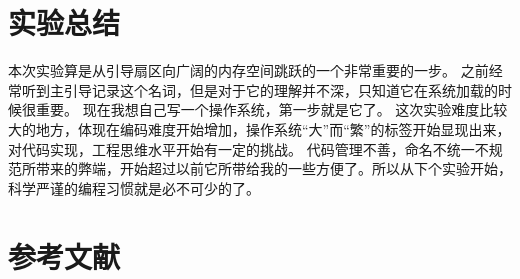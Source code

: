 \documentclass[a4paper,11pt,UTF8]{ctexart}
\begin{document}
\section{实验总结}
本次实验算是从引导扇区向广阔的内存空间跳跃的一个非常重要的一步。
之前经常听到主引导记录这个名词，但是对于它的理解并不深，只知道它在系统加载的时候很重要。
现在我想自己写一个操作系统，第一步就是它了。
这次实验难度比较大的地方，体现在编码难度开始增加，操作系统“大”而“繁”的标签开始显现出来，对代码实现，工程思维水平开始有一定的挑战。
代码管理不善，命名不统一不规范所带来的弊端，开始超过以前它所带给我的一些方便了。所以从下个实验开始，科学严谨的编程习惯就是必不可少的了。

\section{参考文献}




\clearpage
\end{document}
